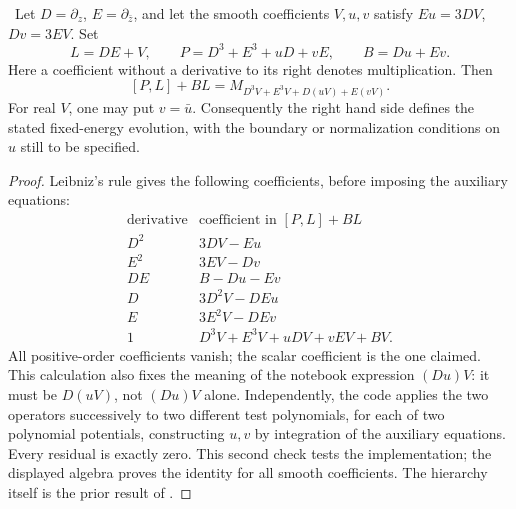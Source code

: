 \begin{proposition}\ours\
Let \(D=\partial_z\), \(E=\partial_{\bar z}\), and let the smooth coefficients
\(V,u,v\) satisfy \(Eu=3DV\), \(Dv=3EV\). Set
\[
 L=DE+V,\qquad P=D^3+E^3+uD+vE,\qquad B=Du+Ev.
\]
Here a coefficient without a derivative to its right denotes multiplication.
Then
\[
 [P,L]+BL=M_{D^3V+E^3V+D(uV)+E(vV)}.
\]
For real \(V\), one may put \(v=\bar u\). Consequently the right hand side
defines the stated fixed-energy evolution, with the boundary or normalization
conditions on \(u\) still to be specified.
\end{proposition}
\begin{proof}
Leibniz's rule gives the following coefficients, before imposing the auxiliary
equations:
\[
\begin{array}{c|l}
\text{derivative} & \text{coefficient in }[P,L]+BL\\\hline
D^2&3DV-Eu\\
E^2&3EV-Dv\\
DE&B-Du-Ev\\
D&3D^2V-DEu\\
E&3E^2V-DEv\\
1&D^3V+E^3V+uDV+vEV+BV.
\end{array}
\]
All positive-order coefficients vanish; the scalar coefficient is the one
claimed. This calculation also fixes the meaning of the notebook expression
\((D u)V\): it must be \(D(uV)\), not \((Du)V\) alone. Independently, the code
applies the two operators successively to two different test polynomials, for
each of two polynomial potentials, constructing \(u,v\) by integration of the
auxiliary equations. Every residual is exactly zero. This second check tests the
implementation; the displayed algebra proves the identity for all smooth
coefficients. The hierarchy itself is the prior result of
\citet[\S II, equations (4)--(6)]{veselovnovikov1984explicit}.
\end{proof}

